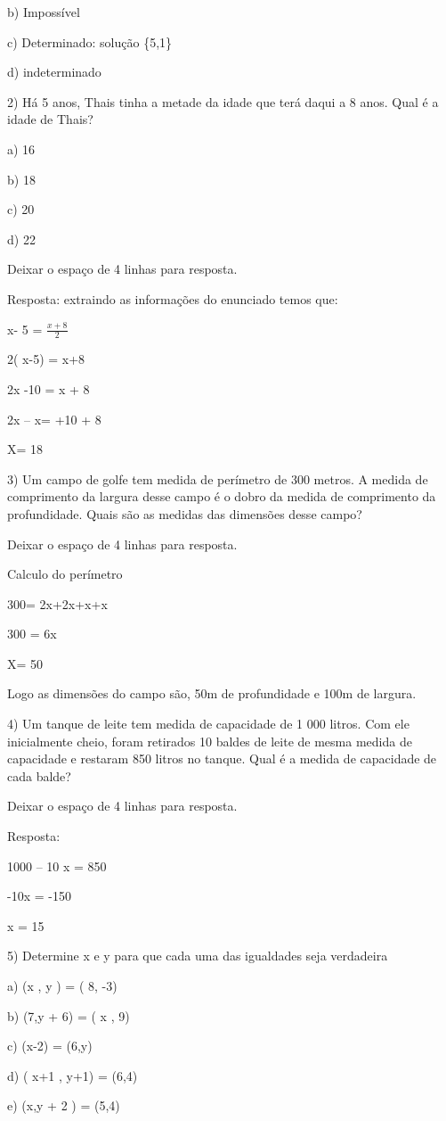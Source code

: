 {b) Impossível

c) Determinado: solução \{5,1\}

d) indeterminado

2) Há 5 anos, Thais tinha a metade da idade que terá daqui a 8 anos.
Qual é a idade de Thais?

a) 16

b) 18

c) 20

d) 22

Deixar o espaço de 4 linhas para resposta.

Resposta: extraindo as informações do enunciado temos que:

x- 5 = \(\frac{x + 8}{2}\)

2( x-5) = x+8

2x -10 = x + 8

2x -- x= +10 + 8

X= 18

3) Um campo de golfe tem medida de perímetro de 300 metros. A medida de
comprimento da largura desse campo é o dobro da medida de comprimento da
profundidade. Quais são as medidas das dimensões desse campo?

Deixar o espaço de 4 linhas para resposta.

Calculo do perímetro

300= 2x+2x+x+x

300 = 6x

X= 50

Logo as dimensões do campo são, 50m de profundidade e 100m de largura.

4) Um tanque de leite tem medida de capacidade de 1 000 litros. Com ele
inicialmente cheio, foram retirados 10 baldes de leite de mesma medida
de capacidade e restaram 850 litros no tanque. Qual é a medida de
capacidade de cada balde?

Deixar o espaço de 4 linhas para resposta.

Resposta:

1000 -- 10 x = 850

-10x = -150

x = 15

5) Determine x e y para que cada uma das igualdades seja verdadeira

a) (x , y ) = ( 8, -3)

b) (7,y + 6) = ( x , 9)

c) (x-2) = (6,y)

d) ( x+1 , y+1) = (6,4)

e) (x,y + 2 ) = (5,4)

}
